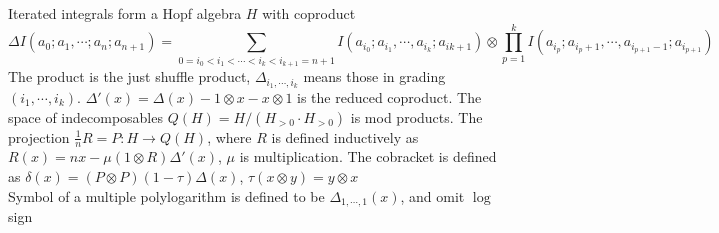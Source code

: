 \documentclass[main]{subfiles}
\begin{document}
\begin{definition}
Iterated integrals form a Hopf algebra $H$ with coproduct
\[\Delta I(a_0;a_1,\cdots;a_n;a_{n+1})=\sum_{0=i_0<i_1<\cdots<i_k<i_{k+1}=n+1}I(a_{i_0};a_{i_1},\cdots,a_{i_k};a_{i{k+1}})\otimes\prod_{p=1}^kI(a_{i_p};a_{i_p+1},\cdots,a_{i_{p+1}-1};a_{i_{p+1}})\]
The product is the just shuffle product, $\Delta_{i_1,\cdots,i_k}$ means those in grading $(i_1,\cdots,i_k)$. $\Delta'(x)=\Delta(x)-1\otimes x-x\otimes1$ is the reduced coproduct. The space of indecomposables $Q(H)=H/(H_{>0}\cdot H_{>0})$ is mod products. The projection $\frac{1}{n}R=P:H\to Q(H)$, where $R$ is defined inductively as  $R(x)=nx-\mu(1\otimes R)\Delta'(x)$, $\mu$ is multiplication. The cobracket is defined as $\delta(x)=(P\otimes P)(1-\tau)\Delta(x)$, $\tau(x\otimes y)=y\otimes x$ \\
Symbol of a multiple polylogarithm is defined to be $\Delta_{1,\cdots,1}(x)$, and omit $\log$ sign
\end{definition}
\end{document}
